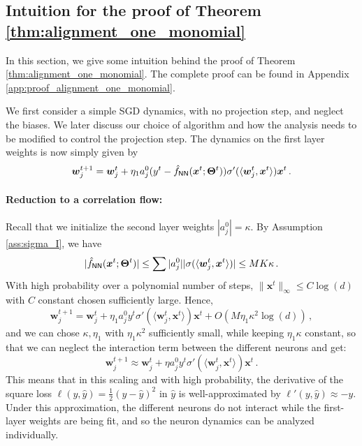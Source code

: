 \documentclass[11pt]{article}
\newcommand{\<}{\langle}
\renewcommand{\>}{\rangle}
\theoremstyle{definition}
\def\bw{{\boldsymbol w}}
\def\bx{{\boldsymbol x}}
\def\bTheta{{\boldsymbol \Theta}}
\def\hf{{\hat f}}
\def\NN{{\sf NN}}
\def\NN{{\sf NN}}
\def\bTheta{{\boldsymbol \Theta}}
\def\NN{{\sf NN}}
\def\bw{{\boldsymbol w}}
\def\bx{{\boldsymbol x}}
\def\bTheta{{\boldsymbol \Theta}}
\def\hf{\hat f}
\begin{document}
\subsection{Intuition for the proof of Theorem \ref{thm:alignment_one_monomial}}\label{app:intuition_monomial}


In this section, we give some intuition behind the proof of Theorem \ref{thm:alignment_one_monomial}. The complete proof can be found in Appendix \ref{app:proof_alignment_one_monomial}.

We first consider a simple SGD dynamics, with no projection step, and neglect the biases. We later discuss our choice of algorithm and how the analysis needs to be modified to control the projection step. The dynamics on the first layer weights is now simply given by
\[
\bw_j^{t+1} = \bw_j^t + \eta_1 a_j^0 ( y^t - \hf_{\NN} (\bx^t ; \bTheta^t ) ) \sigma ' ( \< \bw_j^t , \bx^t \> ) \bx^t \, .
\]

\paragraph*{Reduction to a correlation flow:} Recall that we initialize the second layer weights $|a_j^0| = \kappa$. By Assumption \ref{ass:sigma_I}, we have
\[
| \hf_{\NN} (\bx^t ; \bTheta^t ) | \leq \sum |a_j^0| | \sigma ( \< \bw_j^t , \bx^t \>) | \leq M K \kappa \, .
\]
With high probability over a polynomial number of steps, $\| \bx^t \|_\infty \leq C \log (d)$ with $C$ constant chosen sufficiently large. Hence,
\[
\bw_j^{t+1} = \bw_j^t + \eta_1 a^0_j y^t \sigma ' ( \< \bw_j^t , \bx^t \> ) \bx^t + O( M \eta_1 \kappa^2 \log (d) )\, ,
\]
and we can chose $\kappa,\eta_1$ with $\eta_1 \kappa^2$ sufficiently small, while keeping $\eta_1 \kappa$ constant, so that we can neglect the interaction term between the different neurons and get:
\[
\bw_j^{t+1} \approx \bw_j^t + \eta a^0_j y^t \sigma ' ( \< \bw_j^t , \bx^t \> ) \bx^t \, .
\]
This means that in this scaling and with high probability, the derivative of the square loss $\ell(y,\hat{y}) = \frac{1}{2}(y-\hat{y})^2$ in $\hat{y}$ is well-approximated by $\ell' ( y, \hat y) \approx -y$. Under this approximation, the different neurons do not interact while the first-layer weights are being fit, and so the neuron dynamics can be analyzed individually.
\end{document}
